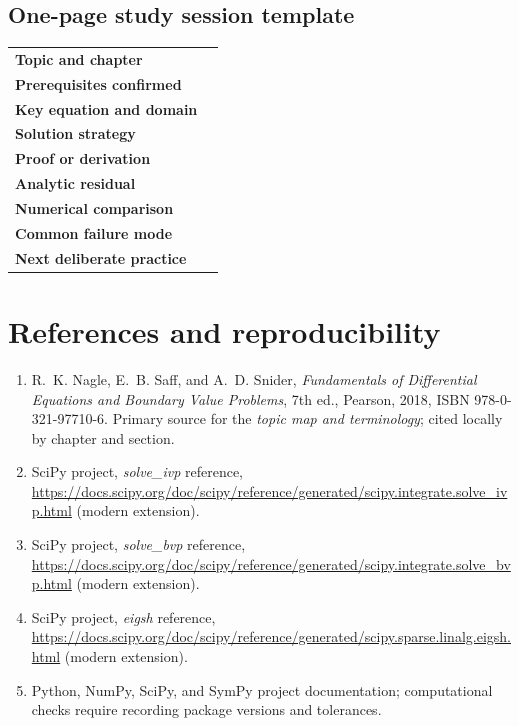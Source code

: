 \documentclass[11pt,letterpaper,oneside]{report}
\theoremstyle{definition}\newtheorem{definition}[theorem]{Definition}
\theoremstyle{remark}\newtheorem{remark}[theorem]{Remark}
\begin{document}
\section{One-page study session template}
\begin{tabularx}{\textwidth}{>{\bfseries}p{}X}\toprule
Topic and chapter & \rule{0pt}{18pt}\\[8pt]
Prerequisites confirmed & \\[10pt]
Key equation and domain & \\[14pt]
Solution strategy & \\[14pt]
Proof or derivation & \\[14pt]
Analytic residual & \\[14pt]
Numerical comparison & \\[14pt]
Common failure mode & \\[14pt]
Next deliberate practice & \\[14pt]
\bottomrule\end{tabularx}

\appendix
\chapter{References and reproducibility}
\begin{enumerate}
\item R.~K. Nagle, E.~B. Saff, and A.~D. Snider, \emph{Fundamentals of Differential Equations and Boundary Value Problems}, 7th ed., Pearson, 2018, ISBN 978-0-321-97710-6. Primary source for the \emph{topic map and terminology}; cited locally by chapter and section.
\item SciPy project, \emph{solve\_ivp} reference, \url{https://docs.scipy.org/doc/scipy/reference/generated/scipy.integrate.solve_ivp.html} (modern extension).
\item SciPy project, \emph{solve\_bvp} reference, \url{https://docs.scipy.org/doc/scipy/reference/generated/scipy.integrate.solve_bvp.html} (modern extension).
\item SciPy project, \emph{eigsh} reference, \url{https://docs.scipy.org/doc/scipy/reference/generated/scipy.sparse.linalg.eigsh.html} (modern extension).
\item Python, NumPy, SciPy, and SymPy project documentation; computational checks require recording package versions and tolerances.
\end{enumerate}
\end{document}
